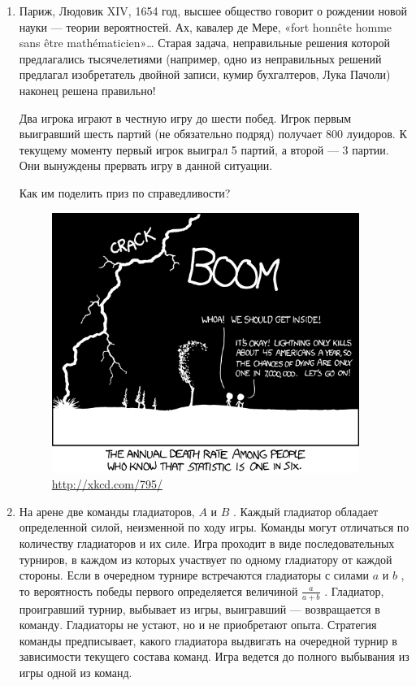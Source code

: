 \documentclass[nobib]{tufte-handout}
\begin{document}
\begin{enumerate}
\item Париж, Людовик XIV, 1654 год, высшее общество говорит о рождении новой науки --- теории вероятностей. Ах, кавалер де Мере, «fort honnête homme sans être mathématicien»\ldots {} Старая задача, неправильные решения которой предлагались тысячелетиями (например, одно из неправильных решений предлагал изобретатель двойной записи, кумир бухгалтеров, Лука Пачоли) наконец решена правильно!


Два игрока играют в честную игру до шести побед. Игрок первым выигравший шесть партий (не обязательно подряд) получает 800 луидоров. К текущему моменту первый игрок выиграл 5 партий, а второй --- 3 партии. Они вынуждены прервать игру в данной ситуации.


Как им поделить приз по справедливости? 

\begin{center}
\begin{figure}[t]
  \includegraphics[width=10cm]{conditional.png}
  \caption{\url{http://xkcd.com/795/}}
\end{figure}
\end{center}

\item На арене две команды гладиаторов,  $A$  и  $B$ . Каждый гладиатор обладает определенной силой, неизменной по ходу игры. Команды могут отличаться по количеству гладиаторов и их силе. Игра проходит в виде последовательных турниров, в каждом из которых участвует по одному гладиатору от каждой стороны. Если в очередном турнире встречаются гладиаторы с силами  $a$  и  $b$ , то вероятность победы первого определяется величиной  $\frac{a}{a+b} $ . Гладиатор, проигравший турнир, выбывает из игры, выигравший --- возвращается в команду. Гладиаторы не устают, но и не приобретают опыта. Стратегия команды предписывает, какого гладиатора выдвигать на очередной турнир в зависимости текущего состава команд. Игра ведется до полного выбывания из игры одной из команд.


\end{enumerate}
\end{document}
